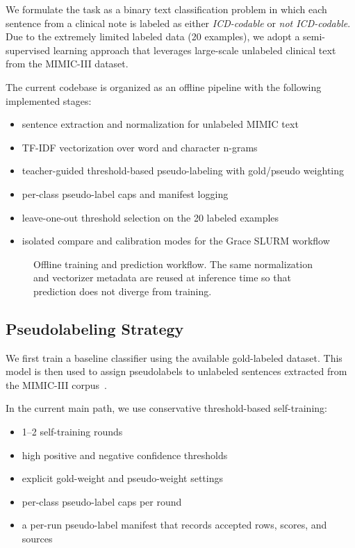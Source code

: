 \documentclass[journal]{IEEEtran}
\begin{document}
We formulate the task as a binary text classification problem in which each sentence from a clinical note is labeled as either \textit{ICD-codable} or \textit{not ICD-codable}. Due to the extremely limited labeled data (20 examples), we adopt a semi-supervised learning approach that leverages large-scale unlabeled clinical text from the MIMIC-III dataset.

The current codebase is organized as an offline pipeline with the following implemented stages:
\begin{itemize}
    \item sentence extraction and normalization for unlabeled MIMIC text~\cite{johnson2016}
    \item TF-IDF vectorization over word and character n-grams
    \item teacher-guided threshold-based pseudo-labeling with gold/pseudo weighting~\cite{lee2013}
    \item per-class pseudo-label caps and manifest logging
    \item leave-one-out threshold selection on the 20 labeled examples
    \item isolated compare and calibration modes for the Grace SLURM workflow
\end{itemize}

\begin{figure}[h]
\centering
{}
\caption{Offline training and prediction workflow. The same normalization and vectorizer metadata are reused at inference time so that prediction does not diverge from training.}
\label{fig:pipeline}
\end{figure}

\subsection{Pseudolabeling Strategy}

We first train a baseline classifier using the available gold-labeled dataset. This model is then used to assign pseudolabels to unlabeled sentences extracted from the MIMIC-III corpus~\cite{johnson2016,lee2013}.

In the current main path, we use conservative threshold-based self-training:
\begin{itemize}
    \item 1--2 self-training rounds
    \item high positive and negative confidence thresholds
    \item explicit gold-weight and pseudo-weight settings
    \item per-class pseudo-label caps per round
    \item a per-run pseudo-label manifest that records accepted rows, scores, and sources
\end{itemize}
\end{document}
